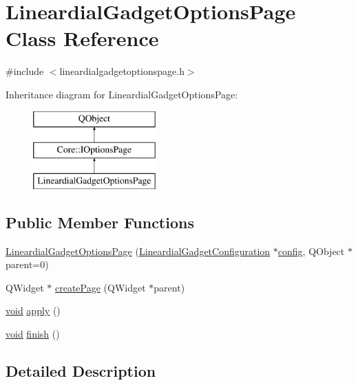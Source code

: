 \hypertarget{class_lineardial_gadget_options_page}{\section{Lineardial\-Gadget\-Options\-Page Class Reference}
\label{class_lineardial_gadget_options_page}
}


{\ttfamily \#include $<$lineardialgadgetoptionspage.\-h$>$}

Inheritance diagram for Lineardial\-Gadget\-Options\-Page\-:\begin{figure}[H]
\begin{center}
\leavevmode
\includegraphics[height=3.000000cm]{class_lineardial_gadget_options_page}
\end{center}
\end{figure}
\subsection*{Public Member Functions}
\begin{DoxyCompactItemize}
\item 
\hyperlink{group___linear_dial_plugin_gaa49909f8404b5303882872f6bb8ccdb2}{Lineardial\-Gadget\-Options\-Page} (\hyperlink{class_lineardial_gadget_configuration}{Lineardial\-Gadget\-Configuration} $\ast$\hyperlink{deflate_8c_a4473b5227787415097004fd39f55185e}{config}, Q\-Object $\ast$parent=0)
\item 
Q\-Widget $\ast$ \hyperlink{group___linear_dial_plugin_ga7498a19341fff9fe87afe47efb379a00}{create\-Page} (Q\-Widget $\ast$parent)
\item 
\hyperlink{group___u_a_v_objects_plugin_ga444cf2ff3f0ecbe028adce838d373f5c}{void} \hyperlink{group___linear_dial_plugin_gace7e2623dbc910a445c0f4f772fb85cb}{apply} ()
\item 
\hyperlink{group___u_a_v_objects_plugin_ga444cf2ff3f0ecbe028adce838d373f5c}{void} \hyperlink{group___linear_dial_plugin_ga5afd30269776667128093b5ec5bef9de}{finish} ()
\end{DoxyCompactItemize}


\subsection{Detailed Description}


